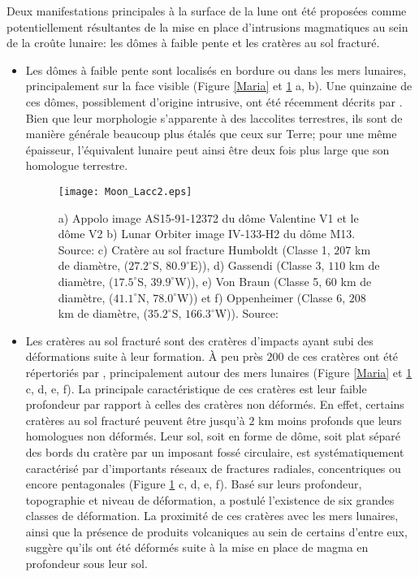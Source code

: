 Deux manifestations principales à la surface de la lune ont été
proposées comme potentiellement résultantes de la mise en place
d'intrusions magmatiques au sein de la croûte lunaire: les dômes à
faible pente et les cratères au sol fracturé.

\begin{itemize}
\item Les dômes à faible pente sont localisés en bordure ou dans les
 mers lunaires, principalement sur la face visible (Figure
 \ref{Maria} et \ref{C1-Moon-magma} a, b). Une quinzaine de ces
 dômes, possiblement d'origine intrusive, ont été récemment décrits
 par \citet{Wohler:2007it}. Bien que leur morphologie s'apparente à
 des laccolites terrestres, ils sont de manière générale beaucoup
 plus étalés que ceux sur Terre; pour une même épaisseur,
 l'équivalent lunaire peut ainsi être deux fois plus large que son
 homologue terrestre.

 \begin{figure}[htpb]
 \begin{center}
 \graphicspath{ {/Users/thorey/Documents/These/Manuscript/Figure/Chapter1/} }
 \texttt{[image: Moon\_Lacc2.eps]}
 \caption{a) Appolo image AS15-91-12372 du dôme Valentine V1 et
 le dôme V2 b) Lunar Orbiter image IV-133-H2 du dôme
 M13. Source: \citet{Wohler:2009jj} c) Cratère au sol fracture
 Humboldt (Classe 1, $207$ km de diamètre, ($27.2^\circ$S,
 $80.9^\circ$E)), d) Gassendi (Classe 3, $110$ km de diamètre,
 ($17.5^\circ$S, $39.9^\circ$W)), e) Von Braun (Classe 5, $60$
 km de diamètre, ($41.1^\circ$N, $78.0^\circ$W)) et f)
 Oppenheimer (Classe 6, $208$ km de diamètre, ($35.2^\circ$S,
 $166.3^\circ$W)). Source: \citet{Jozwiak:2015iy}}
 \label{C1-Moon-magma}
 \end{center}
 \end{figure}

\item Les cratères au sol fracturé sont des cratères d'impacts ayant
 subi des déformations suite à leur formation. À peu près $ 200$ de
 ces cratères ont été répertoriés par \citet{Schultz:1976kt},
 principalement autour des mers lunaires (Figure \ref{Maria} et
 \ref{C1-Moon-magma} c, d, e, f). La principale caractéristique de
 ces cratères est leur faible profondeur par rapport à celles des
 cratères non déformés. En effet, certains cratères au sol fracturé
 peuvent être jusqu'à $2$ km moins profonds que leurs homologues non
 déformés. Leur sol, soit en forme de dôme, soit plat séparé des
 bords du cratère par un imposant fossé circulaire, est
 systématiquement caractérisé par d'importants réseaux de fractures
 radiales, concentriques ou encore pentagonales (Figure
 \ref{C1-Moon-magma} c, d, e, f). Basé sur leurs profondeur,
 topographie et niveau de déformation, \citet{Schultz:1976kt} a
 postulé l'existence de six grandes classes de déformation. La
 proximité de ces cratères avec les mers lunaires, ainsi que la
 présence de produits volcaniques au sein de certains d'entre eux,
 suggère qu'ils ont été déformés suite à la mise en place de magma en
 profondeur sous leur sol.
\end{itemize}

